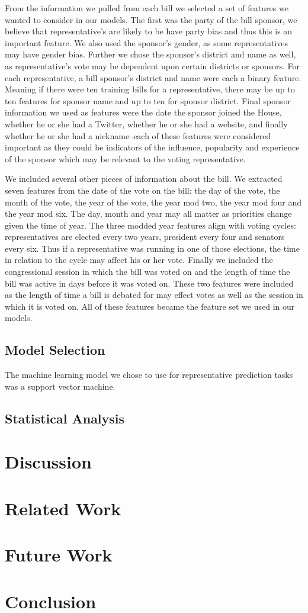 \documentclass[11pt,letterpaper,twocolumn]{article}
\begin{document}
	From the information we pulled from each bill we selected a set of features we wanted to consider in our models. The first was the party of the bill sponsor, we believe that representative's are likely to be have party bias and thus this is an important feature. We also used the sponsor's gender, as some representatives may have gender bias. Further we chose the sponsor's district and name as well, as representative's vote may be dependent upon certain districts or sponsors. For each representative, a bill sponsor's district and name were each a binary feature. Meaning if there were ten training bills for a representative, there may be up to ten features for sponsor name and up to ten for sponsor district. Final sponsor information we used as features were the date the sponsor joined the House, whether he or she had a Twitter, whether he or she had a website, and finally whether he or she had a nickname--each of these features were considered important as they could be indicators of the influence, popularity and experience of the sponsor which may be relevant to the voting representative.
	
	We included several other pieces of information about the bill. We extracted seven features from the date of the vote on the bill: the day of the vote, the month of the vote, the year of the vote, the year mod two, the year mod four and the year mod six. The day, month and year may all matter as priorities change given the time of year. The three modded year features align with voting cycles: representatives are elected every two years, president every four and senators every six. Thus if a representative was running in one of those elections, the time in relation to the cycle may affect his or her vote. Finally we included the congressional session in which the bill was voted on and the length of time the bill was active in days before it was voted on. These two features were included as the length of time a bill is debated for may effect votes as well as the session in which it is voted on. All of these features became the feature set we used in our models.

\subsection{Model Selection}

The machine learning model we chose to use for representative prediction tasks was a support vector machine.

\subsection{Statistical Analysis}

\section{Discussion}

\section{Related Work}

\section{Future Work}

\section{Conclusion}
\end{document}
